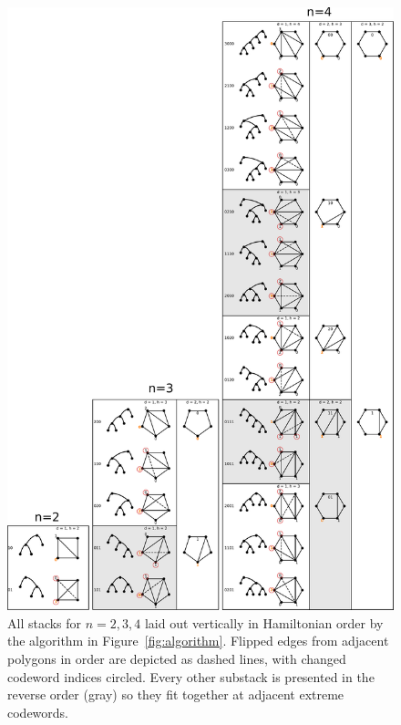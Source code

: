 \documentclass[english]{socg-lipics-v2021}
\begin{document}
\begin{figure}
    \centering
    \includegraphics[width=\textwidth]{stacks.pdf}
    \caption{All stacks for $n=2,3,4$ laid out vertically in Hamiltonian order by the algorithm in Figure~\ref{fig:algorithm}.  Flipped edges from adjacent polygons in order are depicted as dashed lines, with changed codeword indices circled.  Every other substack is presented in the reverse order (gray) so they fit together at adjacent extreme codewords.}
    \label{fig:stacks}
\end{figure}




\end{document}
